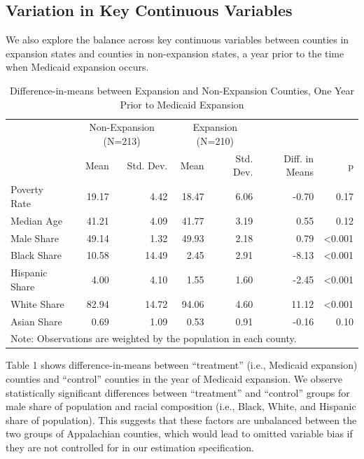 \documentclass[
  11pt,
]{article}
\begin{document}
\hypertarget{variation-in-key-continuous-variables}{%
\subsection{Variation in Key Continuous
Variables}\label{variation-in-key-continuous-variables}}

We also explore the balance across key continuous variables between
counties in expansion states and counties in non-expansion states, a
year prior to the time when Medicaid expansion occurs.

\begin{table}[H]

\caption{\label{tab:create diif in means}Difference-in-means between Expansion and Non-Expansion Counties, One Year Prior to Medicaid Expansion}
\centering
\begin{tabular}[t]{lrrrrrr}
\toprule
\multicolumn{1}{c}{ } & \multicolumn{2}{c}{Non-Expansion (N=213)} & \multicolumn{2}{c}{Expansion (N=210)} & \multicolumn{2}{c}{ } \\
\cmidrule(l{3pt}r{3pt}){2-3} \cmidrule(l{3pt}r{3pt}){4-5}
  & Mean & Std. Dev. & Mean & Std. Dev. & Diff. in Means & p\\
\midrule
Poverty Rate & 19.17 & 4.42 & 18.47 & 6.06 & -0.70 & 0.17\\
Median Age & 41.21 & 4.09 & 41.77 & 3.19 & 0.55 & 0.12\\
Male Share & 49.14 & 1.32 & 49.93 & 2.18 & 0.79 & <0.001\\
Black Share & 10.58 & 14.49 & 2.45 & 2.91 & -8.13 & <0.001\\
Hispanic Share & 4.00 & 4.10 & 1.55 & 1.60 & -2.45 & <0.001\\
White Share & 82.94 & 14.72 & 94.06 & 4.60 & 11.12 & <0.001\\
Asian Share & 0.69 & 1.09 & 0.53 & 0.91 & -0.16 & 0.10\\
\bottomrule
\multicolumn{7}{l}{\rule{0pt}{1em}Note: Observations are weighted by the population in each county.}\\
\end{tabular}
\end{table}

Table 1 shows difference-in-means between ``treatment'' (i.e., Medicaid
expansion) counties and ``control'' counties in the year of Medicaid
expansion. We observe statistically significant differences between
``treatment'' and ``control'' groups for male share of population and
racial composition (i.e., Black, White, and Hispanic share of
population). This suggests that these factors are unbalanced between the
two groups of Appalachian counties, which would lead to omitted variable
bias if they are not controlled for in our estimation specification.
\end{document}
